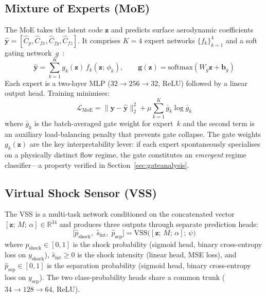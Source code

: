 \documentclass{WCCM-ECCOMAS_2026_Full_Paper}
\begin{document}
\subsection{Mixture of Experts (MoE)}
\label{sec:moe}

The MoE takes the latent code $\mathbf{z}$ and predicts surface
aerodynamic coefficients
$\hat{\mathbf{y}}=[\hat{C}_{p},\hat{C}_{fx},\hat{C}_{fy},\hat{C}_{fz}]$.
It comprises $K=4$ expert networks $\{f_{k}\}_{k=1}^{4}$ and a soft
gating network~$g$~\cite{Jacobs1991,Shazeer2017}:
\begin{equation}
  \hat{\mathbf{y}} =
    \sum_{k=1}^{K} g_{k}(\mathbf{z})\,f_{k}(\mathbf{z};\,\phi_{k}),
  \qquad
  \mathbf{g}(\mathbf{z}) = \mathrm{softmax}(W_{g}\mathbf{z}+\mathbf{b}_{g})
  \label{eq:moe}
\end{equation}
Each expert is a two-layer MLP ($32\!\to\!256\!\to\!32$, ReLU) followed
by a linear output head.  Training minimises:
\begin{equation}
  \mathcal{L}_{\mathrm{MoE}} =
    \|\mathbf{y}-\hat{\mathbf{y}}\|_{2}^{2}
    + \mu\sum_{k=1}^{K}\bar{g}_{k}\log\bar{g}_{k}
  \label{eq:moeloss}
\end{equation}
where $\bar{g}_{k}$ is the batch-averaged gate weight for expert~$k$
and the second term is an auxiliary load-balancing penalty that
prevents gate collapse.  The gate weights $g_{k}(\mathbf{z})$ are the
key interpretability lever: if each expert spontaneously specialises on
a physically distinct flow regime, the gate constitutes an
\emph{emergent} regime classifier---a property verified in
Section~\ref{sec:gateanalysis}.

\subsection{Virtual Shock Sensor (VSS)}
\label{sec:vss}

The VSS is a multi-task network conditioned on the concatenated vector
$[\mathbf{z};\,M;\,\alpha]\in\mathbb{R}^{34}$ and produces three
outputs through separate prediction heads:
\begin{equation}
  \bigl[\hat{p}_{\mathrm{shock}},\;\hat{s}_{\mathrm{int}},\;
        \hat{p}_{\mathrm{sep}}\bigr]
  = \mathrm{VSS}\!\bigl([\mathbf{z};\,M;\,\alpha];\,\psi\bigr)
  \label{eq:vss}
\end{equation}
where $\hat{p}_{\mathrm{shock}}\in[0,1]$ is the shock probability
(sigmoid head, binary cross-entropy loss on $y_{\mathrm{shock}}$),
$\hat{s}_{\mathrm{int}}\geq 0$ is the shock intensity (linear head,
MSE loss), and $\hat{p}_{\mathrm{sep}}\in[0,1]$ is the separation
probability (sigmoid head, binary cross-entropy loss on
$y_{\mathrm{sep}}$).  The two class-probability heads share a common
trunk ($34\!\to\!128\!\to\!64$, ReLU).
\end{document}

